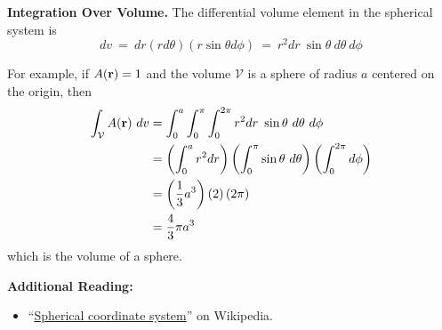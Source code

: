 


{\bf Integration Over Volume.}  
The differential volume element in the spherical system is
%
\begin{equation}
dv ~=~ dr \left(r d\theta \right) \left( r \sin\theta d\phi \right) ~=~ r^2 dr~\sin\theta~d\theta~d\phi 
\end{equation}

For example, if $A({\bf r})=1$ and the volume $\mathcal{V}$ is a sphere of radius $a$ centered on the origin, then 
%
\begin{equation}
\begin{split}
\int_{\mathcal V} A({\bf r})~dv  &= \int_0^a \int_0^{\pi} \int_0^{2\pi}  r^2 dr~\sin\theta~d\theta~d\phi \\
                                 &= \left(\int_0^a r^2 dr \right)  \left( \int_0^{\pi} \sin\theta~d\theta \right)  \left( \int_0^{2\pi} d\phi \right) \\
                                 &= \left( \frac{1}{3} a^3 \right)  \left( 2 \right)  \left(  2\pi \right) \\
                                 &= \frac{4}{3}\pi a^3 
\end{split}
\end{equation} 
%
which is the volume of a sphere. 


{\bf Additional Reading:}
\begin{itemize}
\item ``\href{https://en.wikipedia.org/wiki/Spherical_coordinate_system}{Spherical coordinate system}'' on Wikipedia.
\end{itemize}

